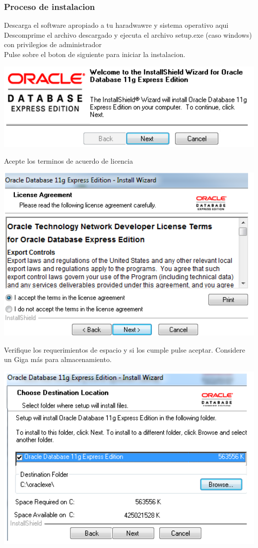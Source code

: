 \documentclass[12pt,letterpaper]{article}
\begin{document}
\subsubsection{Proceso de instalacion}
Descarga el software apropiado a tu haradwawre y sistema operativo aqui\\
Descomprime el archivo descargado y ejecuta el archivo setup.exe (caso windows) con privilegios de administrador\\
Pulse sobre el boton de siguiente para iniciar la instalacion.\\
\begin{center}
\includegraphics[width=15cm]{./IMG/img24}
\end{center}
Acepte los terminos de acuerdo de licencia
\begin{center}
\includegraphics[width=15cm]{./IMG/img25}
\end{center}
Verifique los requerimientos de espacio y si los cumple pulse aceptar. Considere un Giga más para almacenamiento.
\begin{center}
\includegraphics[width=15cm]{./IMG/img26}
\end{center}
\end{document}
